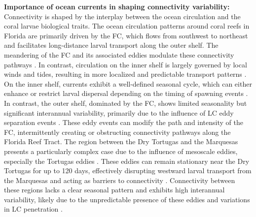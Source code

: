 \documentclass[preprint,12pt,authoryear]{elsarticle}
\begin{document}
\textbf{Importance of ocean currents in shaping connectivity variability:}
Connectivity is shaped by the interplay between the ocean circulation and the coral larvae biological traits. The ocean circulation patterns around coral reefs in Florida are primarily driven by the FC, which flows from southwest to northeast and facilitates long-distance larval transport along the outer shelf. The meandering of the FC and its associated eddies modulate these connectivity pathways \citep{lee1994evolution,kourafalou2012florida}. In contrast, circulation on the inner shelf is largely governed by local winds and tides, resulting in more localized and predictable transport patterns \citep{lee2002volume,liu2012seasonal}. On the inner shelf, currents exhibit a well-defined seasonal cycle, which can either enhance or restrict larval dispersal depending on the timing of spawning events \citep{liu2012seasonal}. In contrast, the outer shelf, dominated by the FC, shows limited seasonality but significant interannual variability, primarily due to the influence of LC eddy separation events \citep{kourafalou2012florida}. These eddy events can modify the path and intensity of the FC, intermittently creating or obstructing connectivity pathways along the Florida Reef Tract. The region between the Dry Tortugas and the Marquesas presents a particularly complex case due to the influence of mesoscale eddies, especially the Tortugas eddies \citep{dobbelaere2022connecting}. These eddies can remain stationary near the Dry Tortugas for up to 120 days, effectively disrupting westward larval transport from the Marquesas and acting as barriers to connectivity \citep{fratantoni1998influence,kourafalou2012florida}. Connectivity between these regions lacks a clear seasonal pattern and exhibits high interannual variability, likely due to the unpredictable presence of these eddies and variations in LC penetration \citep{lee1994evolution}.
\end{document}
